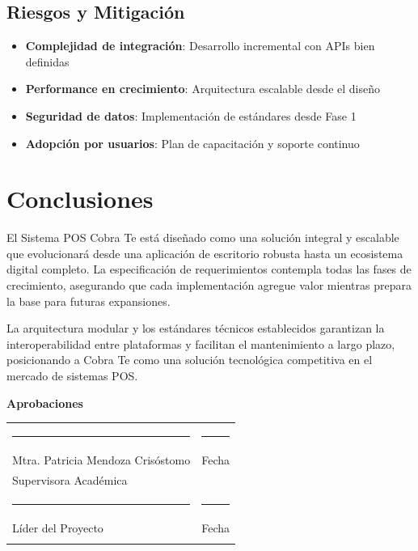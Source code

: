 \documentclass[12pt,letterpaper]{article}
\begin{document}
\subsection{Riesgos y Mitigación}
\begin{itemize}
    \item \textbf{Complejidad de integración}: Desarrollo incremental con APIs bien definidas
    \item \textbf{Performance en crecimiento}: Arquitectura escalable desde el diseño
    \item \textbf{Seguridad de datos}: Implementación de estándares desde Fase 1
    \item \textbf{Adopción por usuarios}: Plan de capacitación y soporte continuo
\end{itemize}

\section{Conclusiones}

El Sistema POS Cobra Te está diseñado como una solución integral y escalable que evolucionará desde una aplicación de escritorio robusta hasta un ecosistema digital completo. La especificación de requerimientos contempla todas las fases de crecimiento, asegurando que cada implementación agregue valor mientras prepara la base para futuras expansiones.

La arquitectura modular y los estándares técnicos establecidos garantizan la interoperabilidad entre plataformas y facilitan el mantenimiento a largo plazo, posicionando a Cobra Te como una solución tecnológica competitiva en el mercado de sistemas POS.

\vspace{2cm}

\begin{center}
\textbf{Aprobaciones}

\vspace{1.5cm}

\begin{tabular}{>{\centering}p{6cm}>{\centering\arraybackslash}p{6cm}}
\rule{5cm}{0.4pt} & \rule{5cm}{0.4pt} \\[0.5cm]
Mtra. Patricia Mendoza Crisóstomo & Fecha \\
Supervisora Académica & \\[1cm]
\rule{5cm}{0.4pt} & \rule{5cm}{0.4pt} \\[0.5cm]
Líder del Proyecto & Fecha \\
& \\
\end{tabular}
\end{center}
\end{document}
